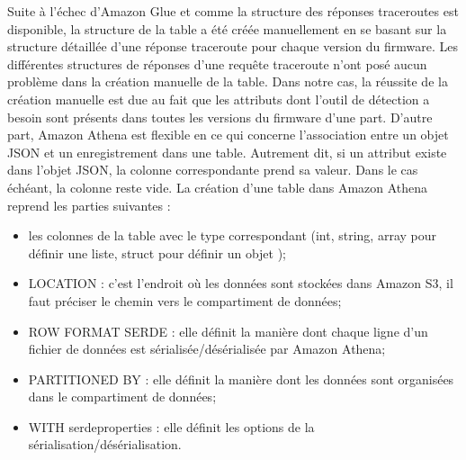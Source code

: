 Suite à l'échec d'Amazon Glue  et comme la structure des réponses traceroutes est disponible,  la structure de la table a été créée   manuellement en se basant sur la structure détaillée d'une réponse traceroute pour chaque version du firmware.  Les différentes structures de réponses d'une requête traceroute n'ont posé aucun problème dans la création manuelle de la table. Dans notre cas, la réussite de la création manuelle est due au fait que les attributs dont l'outil de détection a besoin sont présents dans toutes les versions du firmware d'une part. D'autre part, Amazon Athena est flexible en ce qui concerne l'association entre un objet JSON et un enregistrement dans une table. Autrement dit, si un attribut existe dans l'objet JSON, la colonne correspondante prend sa valeur. Dans le cas échéant, la colonne reste vide.  %
La création d'une table dans Amazon Athena  reprend les parties suivantes  :
\begin{itemize}
	\item les colonnes de la table avec le type correspondant (int, string, array pour définir une liste, struct pour définir un objet );
	\item LOCATION : c'est l'endroit où les données sont stockées dans Amazon S3, il faut préciser le chemin vers le compartiment de données;
	\item ROW FORMAT SERDE : elle définit la manière dont chaque ligne d'un fichier de données est sérialisée/désérialisée par Amazon Athena;
	\item PARTITIONED BY : elle définit la manière dont les données sont organisées dans le compartiment de données; 
	\item WITH serdeproperties : elle définit les options de la sérialisation/désérialisation.
\end{itemize}

